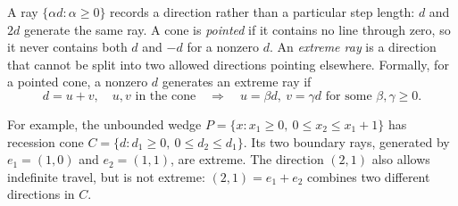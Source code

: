 \documentclass[11pt,a4paper]{article}
\begin{document}
A ray $\{\alpha d:\alpha\geq0\}$ records a direction rather than a particular
step length: $d$ and $2d$ generate the same ray. A cone is \emph{pointed} if
it contains no line through zero, so it never contains both $d$ and $-d$ for
a nonzero $d$. An \emph{extreme ray} is a direction that cannot be split into
two allowed directions pointing elsewhere. Formally, for a pointed cone,
a nonzero $d$ generates an extreme ray if
\[
  d=u+v,\quad u,v\text{ in the cone}
  \quad\Longrightarrow\quad u=\beta d,\ v=\gamma d
  \text{ for some }\beta,\gamma\geq0.
\]

For example, the unbounded wedge
$P=\{x:x_1\geq0,\ 0\leq x_2\leq x_1+1\}$ has recession cone
$C=\{d:d_1\geq0,\ 0\leq d_2\leq d_1\}$. Its two boundary rays, generated
by $e_1=(1,0)$ and $e_2=(1,1)$, are extreme. The direction $(2,1)$ also
allows indefinite travel, but is not extreme: $(2,1)=e_1+e_2$ combines
two different directions in $C$.
\end{document}
